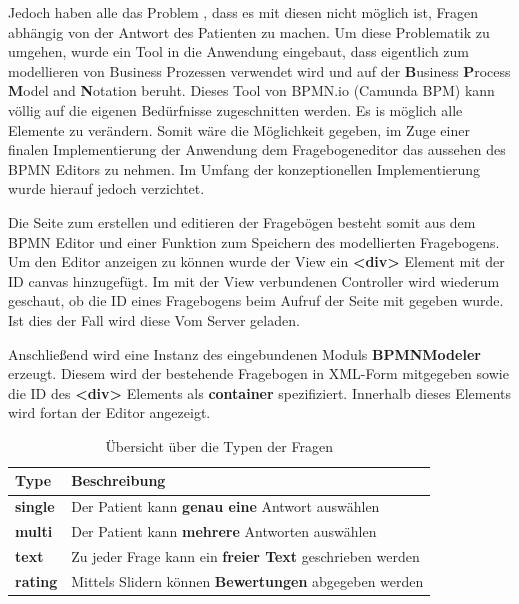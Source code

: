 Jedoch haben alle das Problem , dass es mit diesen nicht möglich ist, Fragen abhängig von der Antwort des Patienten zu machen. Um diese Problematik zu umgehen, wurde ein Tool in die Anwendung eingebaut, dass eigentlich zum modellieren von Business Prozessen verwendet wird und auf der \textbf{B}usiness \textbf{P}rocess \textbf{M}odel and \textbf{N}otation beruht. Dieses Tool von BPMN.io (Camunda BPM) kann völlig auf die eigenen Bedürfnisse zugeschnitten werden. Es is möglich alle Elemente zu verändern. Somit wäre die Möglichkeit gegeben, im Zuge einer finalen Implementierung der Anwendung dem Fragebogeneditor das aussehen des BPMN Editors zu nehmen. Im Umfang der konzeptionellen Implementierung wurde hierauf jedoch verzichtet.

Die Seite zum erstellen und editieren der Fragebögen besteht somit aus dem BPMN Editor und einer Funktion zum Speichern des modellierten Fragebogens. Um den Editor anzeigen zu können wurde der View ein \textbf{<div>} Element mit der ID canvas hinzugefügt. Im mit der View verbundenen Controller wird wiederum geschaut, ob die ID eines Fragebogens beim Aufruf der Seite mit gegeben wurde. Ist dies der Fall wird diese Vom Server geladen.

Anschließend wird eine Instanz des eingebundenen Moduls \textbf{BPMNModeler} erzeugt. Diesem wird der bestehende Fragebogen in XML-Form mitgegeben sowie die ID des \textbf{<div>} Elements als \textbf{container} spezifiziert. Innerhalb dieses Elements wird fortan der Editor angezeigt.

\begin{table}[H]
	\begin{center}
		\begin{tabular}{p{4cm} p{10cm}}
		\rowcolor{black!20} \textbf{Type} &  \textbf{Beschreibung} \\ \toprule
		\textbf{single}		& Der Patient kann \textbf{genau eine} Antwort auswählen  \\ \hline \addlinespace
		\textbf{multi}		& Der Patient kann \textbf{mehrere} Antworten auswählen   \\ \hline \addlinespace
		\textbf{text}		& Zu jeder Frage kann ein \textbf{freier Text} geschrieben werden  \\ \hline \addlinespace
		\textbf{rating}		& Mittels Slidern können \textbf{Bewertungen} abgegeben werden                                    
		\end{tabular}
	\end{center}
	\caption{Übersicht über die Typen der Fragen}
	\label{FrageTypen}
\end{table}

